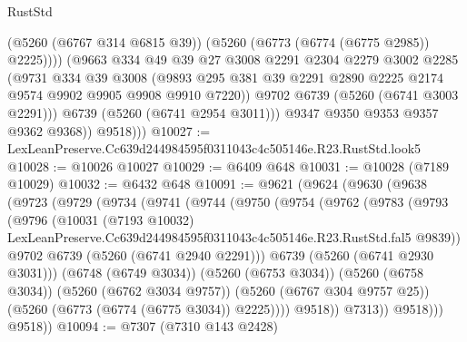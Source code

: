 \begin{lexlean}{RustStd}
\begin{coremodule}
                    (@5260 (@6767 @314 @6815 @39))
                    (@5260 (@6773 (@6774 (@6775 @2985)) @2225))))
                (@9663
                  @334
                  @49
                  @39
                  @27
                  @3008
                  @2291
                  @2304
                  @2279
                  @3002
                  @2285
                  (@9731
                    @334
                    @39
                    @3008
                    (@9893
                      @295
                      @381
                      @39
                      @2291
                      @2890
                      @2225
                      @2174
                      @9574
                      @9902
                      @9905
                      @9908
                      @9910
                      @7220))
                  @9702
                  @6739
                  (@5260 (@6741 @3003 @2291)))
                @6739
                (@5260 (@6741 @2954 @3011)))
              @9347
              @9350
              @9353
              @9357
              @9362
              @9368))
          @9518)))
@10027 := LexLeanPreserve.Cc639d244984595f0311043c4c505146e.R23.RustStd.look5
@10028 := @10026 @10027
@10029 := @6409 @648
@10031 := @10028 (@7189 @10029)
@10032 := @6432 @648
@10091 := @9621
    (@9624
      (@9630
        (@9638
          (@9723
            (@9729
              (@9734
                (@9741
                  (@9744
                    (@9750
                      (@9754
                        (@9762
                          (@9783
                            (@9793
                              (@9796
                                (@10031
                                  (@7193 @10032)
                                  LexLeanPreserve.Cc639d244984595f0311043c4c505146e.R23.RustStd.fal5
                                  @9839))
                              @9702
                              @6739
                              (@5260 (@6741 @2940 @2291)))
                            @6739
                            (@5260 (@6741 @2930 @3031)))
                          (@6748 (@6749 @3034))
                          (@5260 (@6753 @3034))
                          (@5260 (@6758 @3034))
                          (@5260 (@6762 @3034 @9757))
                          (@5260 (@6767 @304 @9757 @25))
                          (@5260 (@6773 (@6774 (@6775 @3034)) @2225))))
                      @9518))
                  @7313))
              @9518)))
        @9518))
@10094 := @7307 (@7310 @143 @2428)

\end{coremodule}
\end{lexlean}

